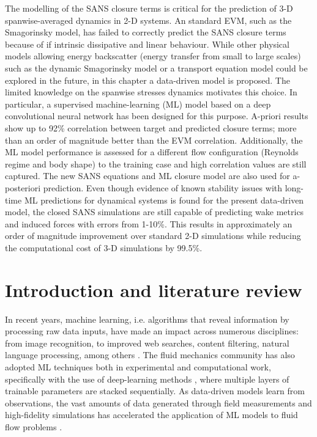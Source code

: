 \documentclass[../main.tex]{subfiles}
\begin{document}
The modelling of the SANS closure terms is critical for the prediction of 3-D spanwise-averaged dynamics in 2-D systems.
An standard EVM, such as the Smagorinsky model, has failed to correctly predict the SANS closure terms because of if intrinsic dissipative and linear behaviour.
While other physical models allowing energy backscatter (energy transfer from small to large scales) such as the dynamic Smagorinsky model or a transport equation model could be explored in the future, in this chapter a data-driven model is proposed.
The limited knowledge on the spanwise stresses dynamics motivates this choice.
In particular, a supervised machine-learning (ML) model based on a deep convolutional neural network has been designed for this purpose.
A-priori results show up to 92\% correlation between target and predicted closure terms; more than an order of magnitude better than the EVM correlation.
Additionally, the ML model performance is assessed for a different flow configuration (Reynolds regime and body shape) to the training case and high correlation values are still captured.
The new SANS equations and ML closure model are also used for a-posteriori prediction.
Even though evidence of known stability issues with long-time ML predictions for dynamical systems is found for the present data-driven model, the closed SANS simulations are still capable of predicting wake metrics and induced forces with errors from 1-10\%.
This results in approximately an order of magnitude improvement over standard 2-D simulations while reducing the computational cost of 3-D simulations by 99.5\%.

\section{Introduction and literature review}

In recent years, machine learning, i.e. algorithms that reveal information by processing raw data inputs, have made an impact across numerous disciplines: from image recognition, to improved web searches, content filtering, natural language processing, among others \citep{LeCun2015}.
The fluid mechanics community has also adopted ML techniques both in experimental and computational work, specifically with the use of deep-learning methods \citep{Kutz2017}, where multiple layers of trainable parameters are stacked sequentially.
As data-driven models learn from observations, the vast amounts of data generated through field measurements and high-fidelity simulations has accelerated the application of ML models to fluid flow problems \citep{Brunton2020}. 
\end{document}
